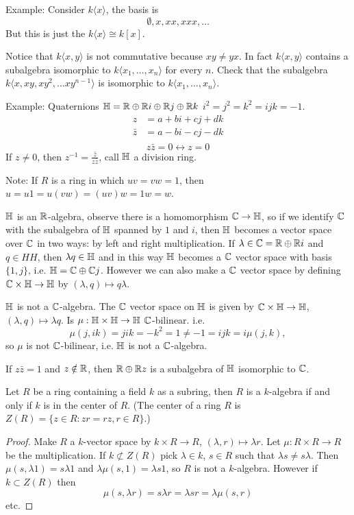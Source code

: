   Example: Consider $k\langle x\rangle$, the basis is
  \[ \emptyset, x, xx, xxx, \ldots\]
  But this is just the $k\langle x \rangle \cong k[x]$.

  Notice that $k\langle x, y\rangle$ is not commutative because $xy \neq yx$.
  In fact $k\langle x, y\rangle$ contains a subalgebra isomorphic to
  $k\langle x_1, \ldots, x_n\rangle$ for every $n$. Check that the subalgebra
  $k\langle x, xy, xy^2, \ldots xy^{n-1} \rangle$ is isomorphic to
  $k\langle x_1, \ldots, x_n \rangle$.

  Example: Quaternions $\mathbb{H} = \mathbb{R} \oplus \mathbb{R} i \oplus \mathbb{R} j \oplus \mathbb{R} k$
  $i^2 = j^2 = k^2 = ijk = -1$.
  \begin{align*}
    z &= a + bi + cj + dk \\
    \bar{z} &= a - bi - cj - dk \\
  \end{align*}
  \[ z\bar{z} = 0 \longleftrightarrow  z = 0 \]
  If $z\neq 0$, then $z^{-1} = \frac{\bar{z}}{z\bar{z}}$, call $\mathbb{H}$ a division
  ring.

  Note: If $R$ is a ring in which $uv = vw = 1$, then
  $u = u1 = u(vw) = (uv)w = 1w = w$.

  $\mathbb{H}$ is an $\mathbb{R}$-algebra, observe there is a homomorphism $\mathbb{C}\to \mathbb{H}$, so
  if we identify $\mathbb{C}$ with the subalgebra of $\mathbb{H}$ spanned by $1$ and $i$,
  then $\mathbb{H}$ becomes a vector space over $\mathbb{C}$ in two ways: by left and right
  multiplication. If $\lambda \in \mathbb{C} = \mathbb{R} \oplus \mathbb{R} i$ and $q \in HH$, then
  $\lambda q \in \mathbb{H}$ and in this way $\mathbb{H}$ becomes a $\mathbb{C}$ vector space with
  basis $\{1,j\}$, i.e. $\mathbb{H} = \mathbb{C} \oplus \mathbb{C} j$. However we can also make a
  $\mathbb{C}$ vector space by defining  $\mathbb{C}\times \mathbb{H} \to \mathbb{H}$ by
  $(\lambda,q) \mapsto q \lambda$.

   $\mathbb{H}$ is not a $\mathbb{C}$-algebra. The $\mathbb{C}$ vector space on $\mathbb{H}$ is
  given by $\mathbb{C} \times \mathbb{H} \to \mathbb{H}$, $(\lambda, q) \mapsto \lambda q$. Is 
  $\mu:\mathbb{H} \times \mathbb{H} \to \mathbb{H}$ $\mathbb{C}$-bilinear. i.e.
  \[ \mu(j,ik) = jik = -k^2 = 1 \neq -1 = ijk = i\mu(j,k), \]
  so $\mu$ is not $\mathbb{C}$-bilinear, i.e. $\mathbb{H}$ is not a $\mathbb{C}$-algebra.

  If $z\bar{z} = 1$ and $z \notin \mathbb{R}$, then $\mathbb{R} \oplus \mathbb{R} z$ is a subalgebra of
  $\mathbb{H}$ isomorphic to $\mathbb{C}$.

  \begin{lemma}
    Let $R$ be a ring containing a field $k$ as a subring, then $R$ is a
    $k$-algebra if and only if $k$ is in the center of $R$. (The center of a
    ring $R$ is $Z(R) = \{z\in R: zr=rz, r \in R\}$.)
  \end{lemma}
  \begin{proof}
    Make $R$ a $k$-vector space by $k\times R \to R$,
    $(\lambda,r) \mapsto \lambda r$. Let $\mu: R \times R \to R$ be the
    multiplication. If $k \not\subset Z(R)$ pick $\lambda \in k$, $s\in R$ such
    that $\lambda s \neq s\lambda$. Then $\mu(s,\lambda 1) = s \lambda 1$ and
    $\lambda\mu(s,1) = \lambda s 1$, so $R$ is not a $k$-algebra. However if
    $k \subset Z(R)$ then 
    \[\mu(s,\lambda r) = s\lambda r = \lambda sr = \lambda\mu(s,r)\]
    etc.
  \end{proof}

